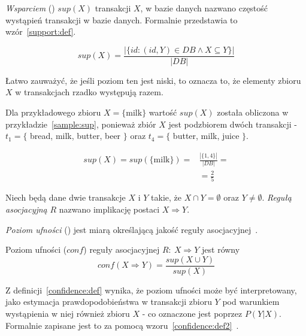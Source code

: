 \emph{Wsparciem} () $sup(X)$ transakcji $X$, w bazie danych nazwano częstość wystąpień transakcji w bazie danych. Formalnie przedstawia to wzór~\ref{support:def}.

\begin{equation}
\label{support:def}
sup(X)=\frac{| \lbrace id: (id,Y)\in DB \wedge X\subseteq Y \rbrace |}{|DB|}
\end{equation}

Łatwo zauważyć, że jeśli poziom ten jest niski, to oznacza to, że elementy zbioru $X$ w transakcjach rzadko występują razem.

Dla przykładowego zbioru $X=\lbrace \textrm{milk} \rbrace$ wartość $sup(X)$ została obliczona w przykładzie~\ref{sample:sup}, ponieważ zbiór $X$ jest podzbiorem dwóch transakcji - $t_1 = \lbrace$ bread, milk, butter, beer $\rbrace$ oraz $t_4 = \lbrace$ butter, milk, juice $\rbrace$.

\begin{equation}\label{sample:sup}
\begin{split}
sup(X)= sup(\lbrace \textrm{milk} \rbrace) =& \frac{|\lbrace 1, 4 \rbrace|}{|DB|} =\\
 &= \frac{2}{5}
\end{split}
\end{equation}

\begin{df}\label{regula:def}
Niech będą dane dwie transakcje $X$ i $Y$ takie, że $X\cap Y=\emptyset$ oraz $Y \neq \emptyset$. \emph{Regułą asocjacyjną} $R$ nazwano implikację postaci $X\Rightarrow  Y$.
\end{df}

\emph{Poziom ufności} () jest miarą określającą jakość reguły asocjacyjnej~\cite{Elmasri:db}. 

\begin{df}\label{confidence:def}
Poziom ufności ($conf$) reguły asocjacyjnej $R:\ X \Rightarrow Y$ jest równy 
\begin{equation}
	conf(X \Rightarrow Y) = \frac{sup(X \cup Y)}{sup(X)}
\end{equation}
\end{df}

Z definicji~\ref{confidence:def} wynika, że poziom ufności może być interpretowany, jako estymacja prawdopodobieństwa w transakcji zbioru $Y$ pod warunkiem wystąpienia w niej również zbioru $X$ - co oznaczone jest poprzez $P(Y | X)$. Formalnie zapisane jest to za pomocą wzoru~\ref{confidence:def2}~\cite{ParallelAlgorithms}.

